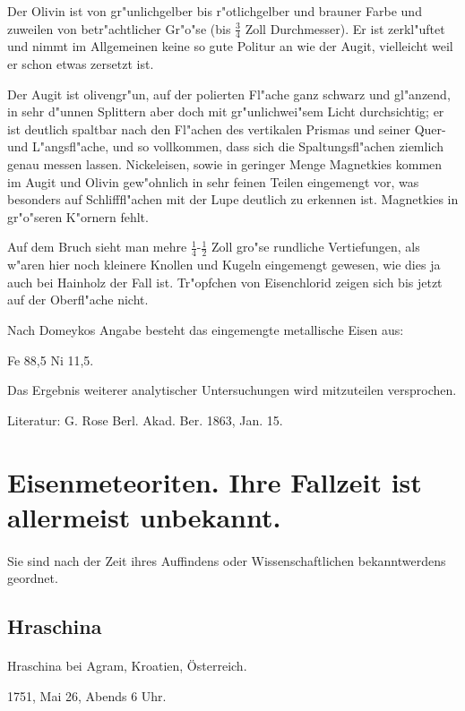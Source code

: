 \documentclass[a4paper, 11pt, oneside]{article}
\begin{document}
Der Olivin ist von gr"unlichgelber bis r"otlichgelber und brauner Farbe und zuweilen von betr"achtlicher Gr"o"se (bis $\frac{3}{4}$ Zoll Durchmesser). Er ist zerkl"uftet und nimmt im Allgemeinen keine so gute Politur an wie der Augit, vielleicht weil er schon etwas zersetzt ist.

Der Augit ist olivengr"un, auf der polierten Fl"ache ganz schwarz und gl"anzend, in sehr d"unnen Splittern aber doch mit gr"unlichwei"sem Licht durchsichtig; er ist deutlich spaltbar nach den Fl"achen des vertikalen Prismas und seiner Quer- und L"angsfl"ache, und so vollkommen, dass sich die Spaltungsfl"achen ziemlich genau messen lassen. Nickeleisen, sowie in geringer Menge Magnetkies kommen im Augit und Olivin gew"ohnlich in sehr feinen Teilen eingemengt vor, was besonders auf Schlifffl"achen mit der Lupe deutlich zu erkennen ist. Magnetkies in gr"o"seren K"ornern fehlt.

Auf dem Bruch sieht man mehre $\frac{1}{4}$-$\frac{1}{2}$ Zoll gro"se rundliche Vertiefungen, als w"aren hier noch kleinere Knollen und Kugeln eingemengt gewesen, wie dies ja auch bei Hainholz der Fall ist. Tr"opfchen von Eisenchlorid zeigen sich bis jetzt auf der Oberfl"ache nicht.

Nach Domeykos Angabe besteht das eingemengte metallische Eisen aus:

Fe 88,5  
Ni 11,5.

Das Ergebnis weiterer analytischer Untersuchungen wird mitzuteilen versprochen.

Literatur: G. Rose Berl. Akad. Ber. 1863, Jan. 15.

\section{Eisenmeteoriten. Ihre Fallzeit ist allermeist unbekannt.}
\normalsize
\paragraph{}
Sie sind nach der Zeit ihres Auffindens oder Wissenschaftlichen bekanntwerdens geordnet.
\subsection{Hraschina}
\paragraph{}
Hraschina bei Agram, Kroatien, Österreich.

1751, Mai 26, Abends 6 Uhr.
\end{document}

